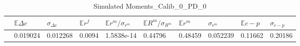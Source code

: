 \begin{table}[H]
\centering
\caption{Simulated Moments_Calib_0_PD_0}
\label{tab:MMoomme}
\begin{tabular}{@{}llllllllll@{}}
\toprule 
 & $\mathbb{E}\Delta c$ & $\sigma_{\Delta c}$ & $\mathbb{E}r^f$ & $\mathbb{E}r^m/\sigma _{r^m}$ & $\mathbb{E}R^m/\sigma _{R^m}$ & $\mathbb{E}r^m$ & $\sigma_{r^m}$ & $\mathbb{E}c-p$ & $\sigma_{c-p}$  \\ 
\midrule 
 & 0.019024 & 0.012268 & 0.0094 & 1.5838e-14 & 0.44796 & 0.48459 & 0.052239 & 0.11662 & 0.20186 \\ 
\bottomrule 
\end{tabular}
\end{table}
